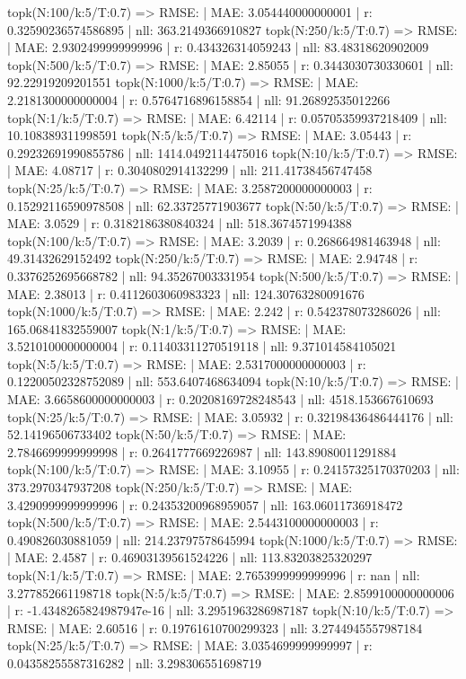 topk(N:100/k:5/T:0.7) => RMSE: | MAE: 3.054440000000001 | r: 0.32590236574586895 | nll: 363.2149366910827
topk(N:250/k:5/T:0.7) => RMSE: | MAE: 2.9302499999999996 | r: 0.434326314059243 | nll: 83.48318620902009
topk(N:500/k:5/T:0.7) => RMSE: | MAE: 2.85055 | r: 0.3443030730330601 | nll: 92.22919209201551
topk(N:1000/k:5/T:0.7) => RMSE: | MAE: 2.2181300000000004 | r: 0.5764716896158854 | nll: 91.26892535012266
topk(N:1/k:5/T:0.7) => RMSE: | MAE: 6.42114 | r: 0.05705359937218409 | nll: 10.108389311998591
topk(N:5/k:5/T:0.7) => RMSE: | MAE: 3.05443 | r: 0.29232691990855786 | nll: 1414.0492114475016
topk(N:10/k:5/T:0.7) => RMSE: | MAE: 4.08717 | r: 0.3040802914132299 | nll: 211.41738456747458
topk(N:25/k:5/T:0.7) => RMSE: | MAE: 3.2587200000000003 | r: 0.15292116590978508 | nll: 62.33725771903677
topk(N:50/k:5/T:0.7) => RMSE: | MAE: 3.0529 | r: 0.3182186380840324 | nll: 518.3674571994388
topk(N:100/k:5/T:0.7) => RMSE: | MAE: 3.2039 | r: 0.268664981463948 | nll: 49.31432629152492
topk(N:250/k:5/T:0.7) => RMSE: | MAE: 2.94748 | r: 0.3376252695668782 | nll: 94.35267003331954
topk(N:500/k:5/T:0.7) => RMSE: | MAE: 2.38013 | r: 0.4112603060983323 | nll: 124.30763280091676
topk(N:1000/k:5/T:0.7) => RMSE: | MAE: 2.242 | r: 0.542378073286026 | nll: 165.06841832559007
topk(N:1/k:5/T:0.7) => RMSE: | MAE: 3.5210100000000004 | r: 0.11403311270519118 | nll: 9.371014584105021
topk(N:5/k:5/T:0.7) => RMSE: | MAE: 2.5317000000000003 | r: 0.12200502328752089 | nll: 553.6407468634094
topk(N:10/k:5/T:0.7) => RMSE: | MAE: 3.6658600000000003 | r: 0.20208169728248543 | nll: 4518.153667610693
topk(N:25/k:5/T:0.7) => RMSE: | MAE: 3.05932 | r: 0.32198436486444176 | nll: 52.14196506733402
topk(N:50/k:5/T:0.7) => RMSE: | MAE: 2.7846699999999998 | r: 0.2641777669226987 | nll: 143.89080011291884
topk(N:100/k:5/T:0.7) => RMSE: | MAE: 3.10955 | r: 0.24157325170370203 | nll: 373.2970347937208
topk(N:250/k:5/T:0.7) => RMSE: | MAE: 3.4290999999999996 | r: 0.24353200968959057 | nll: 163.06011736918472
topk(N:500/k:5/T:0.7) => RMSE: | MAE: 2.5443100000000003 | r: 0.490826030881059 | nll: 214.23797578645994
topk(N:1000/k:5/T:0.7) => RMSE: | MAE: 2.4587 | r: 0.46903139561524226 | nll: 113.83203825320297
topk(N:1/k:5/T:0.7) => RMSE: | MAE: 2.7653999999999996 | r: nan | nll: 3.277852661198718
topk(N:5/k:5/T:0.7) => RMSE: | MAE: 2.8599100000000006 | r: -1.4348265824987947e-16 | nll: 3.2951963286987187
topk(N:10/k:5/T:0.7) => RMSE: | MAE: 2.60516 | r: 0.19761610700299323 | nll: 3.2744945557987184
topk(N:25/k:5/T:0.7) => RMSE: | MAE: 3.0354699999999997 | r: 0.04358255587316282 | nll: 3.298306551698719
